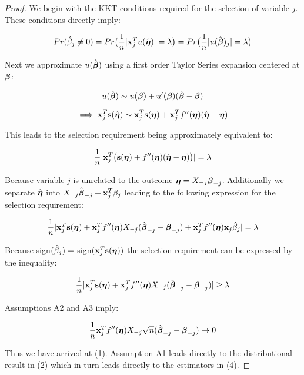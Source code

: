 \begin{proof}

We begin with the KKT conditions required for the selection of variable $j$.  These conditions directly imply:

\begin{equation*}
Pr(\hat{\beta}_j \neq 0)  = Pr\big(\frac{1}{n}|\mathbf{x}_{j}^T u(\hat{\boldsymbol{\eta}})| = \lambda\big)  = Pr\big(\frac{1}{n}|u(\hat{\boldsymbol{\beta}})_j| = \lambda\big)
\end{equation*}

Next we approximate $u(\hat{\boldsymbol{\beta}})$ using a first order Taylor Series expansion centered at $\boldsymbol{\beta}$:

\begin{equation*}
u(\hat{\boldsymbol{\beta}}) \sim u(\boldsymbol{\beta}) + u'(\boldsymbol{\beta})( \hat{\boldsymbol{\beta}} - \boldsymbol{\beta}) 
\end{equation*}

\begin{equation*}
\implies \mathbf{x}_j^T \mathbf{s}(\hat{\boldsymbol{\eta}}) \sim \mathbf{x}_j^T \mathbf{s}(\boldsymbol{\eta}) +  \mathbf{x}_j^T f''(\boldsymbol{\eta}) ( \hat{\boldsymbol{\eta}} - \boldsymbol{\eta})
\end{equation*}

This leads to the selection requirement being approximately equivalent to:

\begin{equation*}
\frac{1}{n}|\mathbf{x}_j^T \big( \mathbf{s}(\boldsymbol{\eta}) + f''(\boldsymbol{\eta}) (\hat{\boldsymbol{\eta}} - \boldsymbol{\eta})  \big) | = \lambda
\end{equation*}

Because variable $j$ is unrelated to the outcome $\boldsymbol{\eta}= X_{-j}\boldsymbol{\beta}_{-j}$.  Additionally we separate $\hat{\boldsymbol{\eta}}$ into $X_{-j}\hat{\boldsymbol{\beta}}_{-j} + \mathbf{x}_j^T\beta_j$ leading to the following expression for the selection requirement:

\begin{equation*}
\frac{1}{n}|\mathbf{x}_j^T \mathbf{s}(\boldsymbol{\eta}) + \mathbf{x}_j^T f''(\boldsymbol{\eta})X_{-j}(\hat{\boldsymbol{\beta}}_{-j} -  \boldsymbol{\beta}_{-j}) + \mathbf{x}_j^T f''(\boldsymbol{\eta})\mathbf{x}_j \hat{\beta}_j |  = \lambda
\end{equation*}

Because sign$(\hat{\beta}_j) =$ sign$(\mathbf{x}_j^T \mathbf{s}(\boldsymbol{\eta}))$ the selection requirement can be expressed by the inequality:

\begin{equation*}
\frac{1}{n}|\mathbf{x}_j^T  \mathbf{s}(\boldsymbol{\eta}) + \mathbf{x}_j^T f''(\boldsymbol{\eta})X_{-j}(\hat{\boldsymbol{\beta}}_{-j} -  \boldsymbol{\beta}_{-j}) |  \geq \lambda
\end{equation*}

Assumptions A2 and A3 imply:

\begin{equation*}
\frac{1}{n}\mathbf{x}_j^T f''(\boldsymbol{\eta})X_{-j}\sqrt{n}(\hat{\boldsymbol{\beta}}_{-j} -  \boldsymbol{\beta}_{-j})  \rightarrow 0
\end{equation*}

Thus we have arrived at (1).  Assumption A1 leads directly to the distributional result in (2) which in turn leads directly to the estimators in (4).\qedhere

\end{proof}

